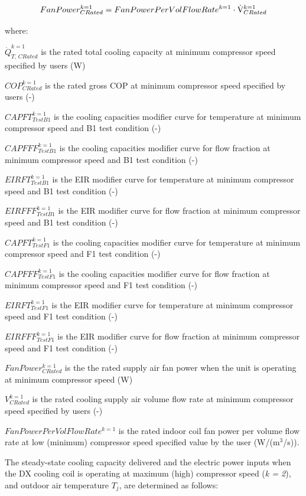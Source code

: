 \begin{equation}
FanPower_{CRated}^{k = 1} = FanPowerPerVolFlowRat{e^{k = 1}} \cdot {\rm{\dot V}}_{CRated}^{k = 1}
\end{equation}

where:

\(\dot Q_{T,\,CRated}^{k = 1}\) is the rated total cooling capacity at minimum compressor speed specified by users (W)

\(COP_{CRated}^{k = 1}\) is the rated gross COP at minimum compressor speed specified by users (-)

\(CAPFT_{TestB1}^{k = 1}\) is the cooling capacities modifier curve for temperature at minimum compressor speed and B1 test condition (-)

\(CAPFFF_{TestB1}^{k = 1}\) is the cooling capacities modifier curve for flow fraction at minimum compressor speed and B1 test condition (-)

\(EIRFT_{TestB1}^{k = 1}\) is the EIR modifier curve for temperature at minimum compressor speed and B1 test condition (-)

\(EIRFFF_{TestB1}^{k = 1}\) is the EIR modifier curve for flow fraction at minimum compressor speed and B1 test condition (-)

\(CAPFT_{TestF1}^{k = 1}\) is the cooling capacities modifier curve for temperature at minimum compressor speed and F1 test condition (-)

\(CAPFFF_{TestF1}^{k = 1}\) is the cooling capacities modifier curve for flow fraction at minimum compressor speed and F1 test condition (-)

\(EIRFT_{TestF1}^{k = 1}\) is the EIR modifier curve for temperature at minimum compressor speed and F1 test condition (-)

\(EIRFFF_{TestF1}^{k = 1}\) is the EIR modifier curve for flow fraction at minimum compressor speed and F1 test condition (-)

\(FanPower_{CRated}^{k = 1}\) is the the rated supply air fan power when the unit is operating at minimum compressor speed (W)

\(V_{CRated}^{k = 1}\) is the rated cooling supply air volume flow rate at minimum compressor speed specified by users (-)

\(FanPowerPerVolFlowRat{e^{k = 1}}\) is the rated indoor coil fan power per volume flow rate at low (minimum) compressor speed specified value by the user (W/(m\(^3\)/s)).

The steady-state cooling capacity delivered and the electric power inputs when the DX cooling coil is operating at maximum (high) compressor speed (\emph{k = 2}), and outdoor air temperature \(T_{j}\), are determined as follows:

